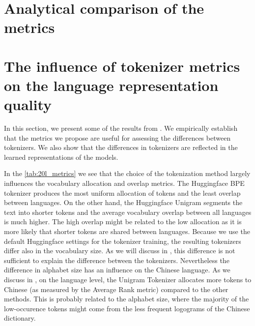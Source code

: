 \section{Analytical comparison of the metrics}


\section{The influence of tokenizer metrics on the language representation quality}
\label{sec:influence_of_metrics}

In this section, we present some of the results from \citet{limisiewicz_tokenization_2023}. We empirically establish that the metrics we propose are useful for assessing the differences between tokenizers. We also show that the differences in tokenizers are reflected in the learned representations of the models. 




In the \autoref{tab:20l_metrics} we see that the choice of the tokenization method largely influences the vocabulary allocation and overlap metrics. The Huggingface BPE tokenizer produces the most uniform allocation of tokens and the least overlap between languages. On the other hand, the Huggingface Unigram segments the text into shorter tokens and the average vocabulary overlap between all languages is much higher. The high overlap might be related to the low allocation as it is more likely that shorter tokens are shared between languages. Because we use the default Huggingface settings for the tokenizer training, the resulting tokenizers differ also in the vocabulary size. As we will discuss in , this difference is not sufficient to explain the difference between the tokenizers. Nevertheless the difference in alphabet size has an influence on the Chinese language. As we discuss in \citet{limisiewicz_tokenization_2023}, on the language level, the Unigram Tokenizer allocates more tokens to Chinese (as measured by the Average Rank metric) compared to the other methods. This is probably related to the alphabet size, where the majority of the low-occurence tokens might come from the less frequent logograms of the Chinese dictionary.

